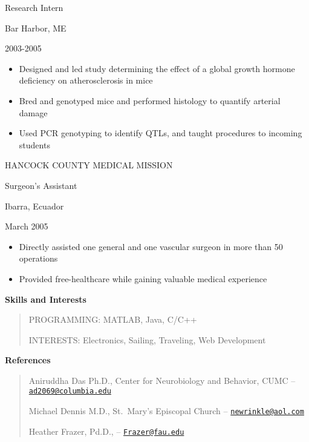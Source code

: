 Research Intern

Bar Harbor, ME

2003-2005

\begin{itemize}
\item
  Designed and led study determining the effect of a global growth
  hormone deficiency on atherosclerosis in mice
\item
  Bred and genotyped mice and performed histology to quantify arterial
  damage
\item
  Used PCR genotyping to identify QTLs, and taught procedures to
  incoming students
\end{itemize}

HANCOCK COUNTY MEDICAL MISSION

Surgeon's Assistant

Ibarra, Ecuador

March 2005

\begin{itemize}
\item
  Directly assisted one general and one vascular surgeon in more than 50
  operations
\item
  Provided free-healthcare while gaining valuable medical experience
\end{itemize}

\textbf{Skills and Interests}

\begin{quote}
PROGRAMMING: MATLAB, Java, C/C++

INTERESTS: Electronics, Sailing, Traveling, Web Development
\end{quote}

\textbf{References}

\begin{quote}
Aniruddha Das Ph.D., Center for Neurobiology and Behavior, CUMC --
\href{mailto:ad2069@columbia.edu}{\nolinkurl{ad2069@columbia.edu}}

Michael Dennis M.D., St.~Mary's Episcopal Church --
\href{mailto:newrinkle@aol.com}{\nolinkurl{newrinkle@aol.com}}

Heather Frazer, Pd.D., --
\href{mailto:Frazer@fau.edu}{\nolinkurl{Frazer@fau.edu}}
\end{quote}
